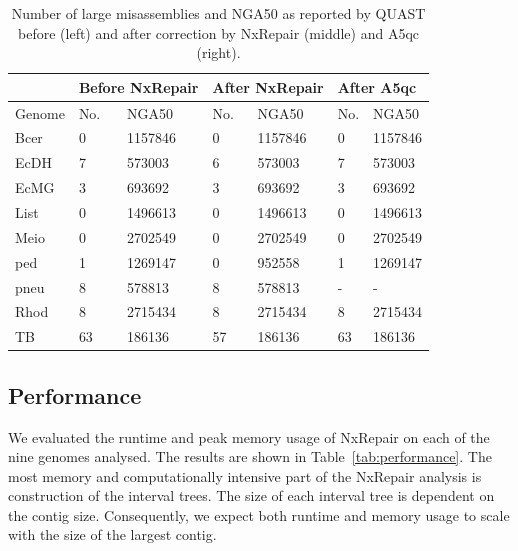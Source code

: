 \documentclass[fleqn,10pt]{wlpeerj}
\begin{document}
\begin{table}[]
\begin{center}
{\begin{tabular}{lllllll}\hline
 & \multicolumn{2}{l}{Before NxRepair} & \multicolumn{2}{l}{{\bf After NxRepair}} & \multicolumn{2}{l}{After A5qc} \\\hline
Genome & No. & NGA50 & No. & NGA50 & No. & NGA50 \\\midrule
Bcer & 0 & 1157846 & 0 & 1157846 & 0 & 1157846 \\
EcDH & 7 & 573003 & 6 & 573003 & 7 & 573003 \\
EcMG & 3 & 693692 & 3 & 693692 & 3 & 693692\\
List & 0 & 1496613 & 0 & 1496613 & 0 & 1496613 \\
Meio & 0 & 2702549 & 0 & 2702549 & 0 & 2702549 \\
ped & 1 & 1269147 & 0 & 952558 & 1 & 1269147 \\
pneu & 8 & 578813 & 8 & 578813 & - & - \\
Rhod & 8 & 2715434 & 8 & 2715434 & 8 & 2715434 \\
TB & 63 & 186136 & 57 & 186136 & 63 & 186136 \\\hline
\end{tabular}}{}
\end{center}
\caption{Number of large misassemblies and NGA50 as reported by QUAST before (left) and after correction by NxRepair (middle) and A5qc (right). \label{tab:improvement}}
\end{table}  


\subsection*{Performance}
We evaluated the runtime and peak memory usage of NxRepair on each of the nine genomes analysed. The results are shown in Table~\ref{tab:performance}. The most memory and computationally intensive part of the NxRepair analysis is construction of the interval trees. The size of each interval tree is dependent on the contig size. Consequently, we expect both runtime and memory usage to scale with the size of the largest contig. 
\end{document}
